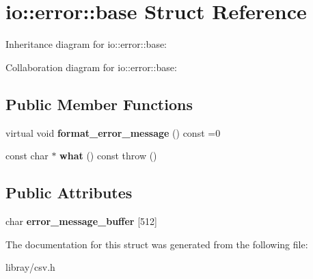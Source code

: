 \hypertarget{structio_1_1error_1_1base}{}\section{io\+:\+:error\+:\+:base Struct Reference}
\label{structio_1_1error_1_1base}


Inheritance diagram for io\+:\+:error\+:\+:base\+:


Collaboration diagram for io\+:\+:error\+:\+:base\+:
\subsection*{Public Member Functions}
\begin{DoxyCompactItemize}
\item 
\mbox{\label{structio_1_1error_1_1base_a7d9ff6a31b716a24f056cf8a3e15191d}} 
virtual void {\bfseries format\+\_\+error\+\_\+message} () const =0
\item 
\mbox{\label{structio_1_1error_1_1base_a35483dfbe91cea45cfa7c5613e83e5ef}} 
const char $\ast$ {\bfseries what} () const  throw ()
\end{DoxyCompactItemize}
\subsection*{Public Attributes}
\begin{DoxyCompactItemize}
\item 
\mbox{\label{structio_1_1error_1_1base_a3be516c4636b7b61133968cb8081c885}} 
char {\bfseries error\+\_\+message\+\_\+buffer} \mbox{[}512\mbox{]}
\end{DoxyCompactItemize}


The documentation for this struct was generated from the following file\+:\begin{DoxyCompactItemize}
\item 
libray/csv.\+h\end{DoxyCompactItemize}
